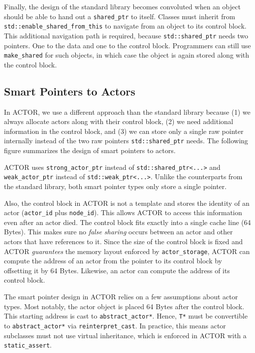 
Finally, the design of the standard library becomes convoluted when an object
should be able to hand out a \lstinline^shared_ptr^ to itself. Classes must
inherit from \lstinline^std::enable_shared_from_this^ to navigate from an
object to its control block. This additional navigation path is required,
because \lstinline^std::shared_ptr^ needs two pointers. One to the data and one
to the control block. Programmers can still use \lstinline^make_shared^ for
such objects, in which case the object is again stored along with the control
block.

\subsection{Smart Pointers to Actors}

In ACTOR, we use a different approach than the standard library because (1) we
always allocate actors along with their control block, (2) we need additional
information in the control block, and (3) we can store only a single raw
pointer internally instead of the two raw pointers \lstinline^std::shared_ptr^
needs. The following figure summarizes the design of smart pointers to actors.


ACTOR uses \lstinline^strong_actor_ptr^ instead of
\lstinline^std::shared_ptr<...>^ and \lstinline^weak_actor_ptr^ instead of
\lstinline^std::weak_ptr<...>^. Unlike the counterparts from the standard
library, both smart pointer types only store a single pointer.

Also, the control block in ACTOR is not a template and stores the identity of an
actor (\lstinline^actor_id^ plus \lstinline^node_id^). This allows ACTOR to
access this information even after an actor died. The control block fits
exactly into a single cache line (64 Bytes). This makes sure no \emph{false
sharing} occurs between an actor and other actors that have references to it.
Since the size of the control block is fixed and ACTOR \emph{guarantees} the
memory layout enforced by \lstinline^actor_storage^, ACTOR can compute the
address of an actor from the pointer to its control block by offsetting it by
64 Bytes. Likewise, an actor can compute the address of its control block.

The smart pointer design in ACTOR relies on a few assumptions about actor types.
Most notably, the actor object is placed 64 Bytes after the control block. This
starting address is cast to \lstinline^abstract_actor*^. Hence, \lstinline^T*^
must be convertible to \lstinline^abstract_actor*^ via
\lstinline^reinterpret_cast^. In practice, this means actor subclasses must not
use virtual inheritance, which is enforced in ACTOR with a
\lstinline^static_assert^.

